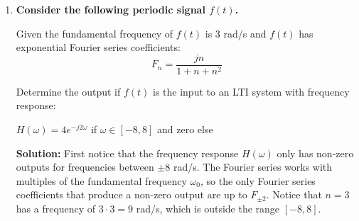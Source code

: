 \documentclass[12pt,letterpaper, onecolumn]{exam}
\begin{document}
\begin{enumerate}
        To solve this problem, we first write KCL at the capacitor node. The current through the resistor plus the current into the capacitor must sum to zero:

        \[
            \frac{v(t)-f(t)}{R} + C\frac{dv(t)}{dt} = 0
        \]

        Plugging in $R=2$ and $C=1$:

        \[
            \frac{v(t)-4e^{-t}}{2} + \frac{dv(t)}{dt} = 0
        \]

        Multiplying by 2 gives the differential equation:

        \[
            2\frac{dv(t)}{dt} + v(t) = 4e^{-t}
        \]

        Solving this ODE, we rewrite it as:

        \[
            \frac{dv(t)}{dt} + \frac{1}{2}v(t) = 2e^{-t}
        \]

        Using the integrating factor $e^{t/2}$, we get:

        \[
            \frac{d}{dt}\left(v(t)e^{t/2}\right) = 2e^{-t/2}
        \]

        Integrating both sides:

        \[
            v(t)e^{t/2} = -4e^{-t/2} + K
        \]

        Solving for $v(t)$:

        \[
            v(t) = -4e^{-t} + Ke^{-t/2}
        \]

        Applying the initial condition $v(0)=1$:

        \[
            1 = -4 + K \quad \Rightarrow \quad K=5
        \]

        Thus, the full solution is:

        \[
            v(t) = -4e^{-t} + 5e^{-t/2}
        \]

\item \textbf{Consider the following periodic signal $f(t)$.}

\begin{questions}
\question Given the fundamental frequency of $f(t)$ is 3 rad/s and $f(t)$ has exponential Fourier series coefficients:
    \[F_n = \frac{jn}{1+n+n^2}\]

Determine the output if $f(t)$ is the input to an LTI system with frequency response:
\begin{center}
    $H(\omega) = 4e^{-j2\omega}$ if $\omega \in [-8,8]$ and zero else
\end{center}

\textbf{Solution: } First notice that the frequency response $H(\omega)$ only has non-zero outputs for frequencies between $\pm 8$ rad/s. The Fourier series works with multiples of the fundamental frequency $\omega_0$, so the only Fourier series coefficients that produce a non-zero output are up to $F_{\pm 2}$. Notice that $n=3$ has a frequency of $3 \cdot 3 = 9$ rad/s, which is outside the range $[-8,8]$. \\


\end{questions}
\end{enumerate}
\end{document}
